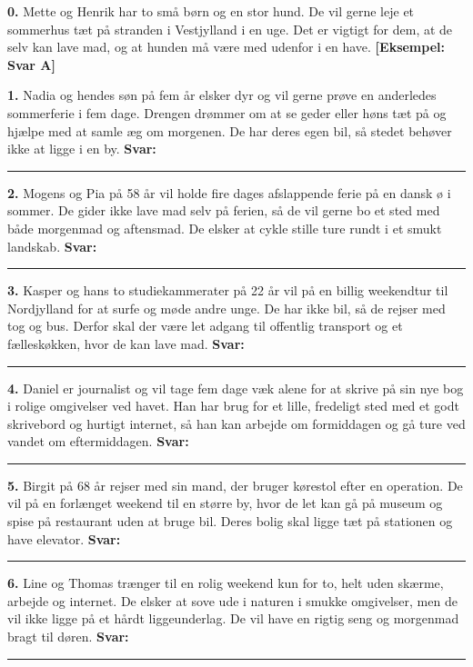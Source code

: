 \begin{tcolorbox}[enhanced, breakable, colback=NCDBgGray, colframe=NCDGray, coltitle=white, fonttitle=\bfseries, title={Personerne (0--6)}, arc=2pt, boxrule=0.8pt, borderline west={3pt}{0pt}{NCDNavy}, left=10pt, right=10pt, top=7pt, bottom=7pt]
\small
\textbf{0.} Mette og Henrik har to små børn og en stor hund. De vil gerne leje et sommerhus tæt på stranden i Vestjylland i en uge. Det er vigtigt for dem, at de selv kan lave mad, og at hunden må være med udenfor i en have. \quad \textcolor{NCDRed}{\textbf{[Eksempel: Svar A]}}

\vspace{0.4em}
\textbf{1.} Nadia og hendes søn på fem år elsker dyr og vil gerne prøve en anderledes sommerferie i fem dage. Drengen drømmer om at se geder eller høns tæt på og hjælpe med at samle æg om morgenen. De har deres egen bil, så stedet behøver ikke at ligge i en by. \quad \textbf{Svar:} \rule{1.2cm}{0.4pt}

\vspace{0.4em}
\textbf{2.} Mogens og Pia på 58 år vil holde fire dages afslappende ferie på en dansk ø i sommer. De gider ikke lave mad selv på ferien, så de vil gerne bo et sted med både morgenmad og aftensmad. De elsker at cykle stille ture rundt i et smukt landskab. \quad \textbf{Svar:} \rule{1.2cm}{0.4pt}

\vspace{0.4em}
\textbf{3.} Kasper og hans to studiekammerater på 22 år vil på en billig weekendtur til Nordjylland for at surfe og møde andre unge. De har ikke bil, så de rejser med tog og bus. Derfor skal der være let adgang til offentlig transport og et fælleskøkken, hvor de kan lave mad. \quad \textbf{Svar:} \rule{1.2cm}{0.4pt}

\vspace{0.4em}
\textbf{4.} Daniel er journalist og vil tage fem dage væk alene for at skrive på sin nye bog i rolige omgivelser ved havet. Han har brug for et lille, fredeligt sted med et godt skrivebord og hurtigt internet, så han kan arbejde om formiddagen og gå ture ved vandet om eftermiddagen. \quad \textbf{Svar:} \rule{1.2cm}{0.4pt}

\vspace{0.4em}
\textbf{5.} Birgit på 68 år rejser med sin mand, der bruger kørestol efter en operation. De vil på en forlænget weekend til en større by, hvor de let kan gå på museum og spise på restaurant uden at bruge bil. Deres bolig skal ligge tæt på stationen og have elevator. \quad \textbf{Svar:} \rule{1.2cm}{0.4pt}

\vspace{0.4em}
\textbf{6.} Line og Thomas trænger til en rolig weekend kun for to, helt uden skærme, arbejde og internet. De elsker at sove ude i naturen i smukke omgivelser, men de vil ikke ligge på et hårdt liggeunderlag. De vil have en rigtig seng og morgenmad bragt til døren. \quad \textbf{Svar:} \rule{1.2cm}{0.4pt}
\end{tcolorbox}

